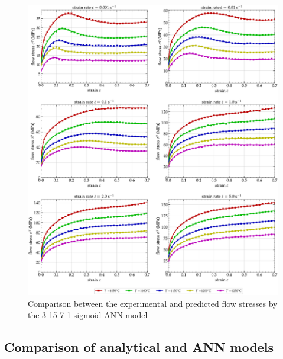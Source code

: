 \documentclass[twoside,english,1p,final,sort&compress]{elsarticle}
\theoremstyle{plain}
\begin{document}
\begin{figure}[!ht]
\centering
\includegraphics[width=1\columnwidth]
{Figures/CompExp-3-15-7-1-sigmoid}
\caption{Comparison between the experimental and predicted flow stresses by the 3-15-7-1-sigmoid ANN model}
\label{fig:iCorrelationANN}
\end{figure}
\FloatBarrier
\subsection{Comparison of analytical and ANN models\label{sec:Comparison}}
\end{document}
